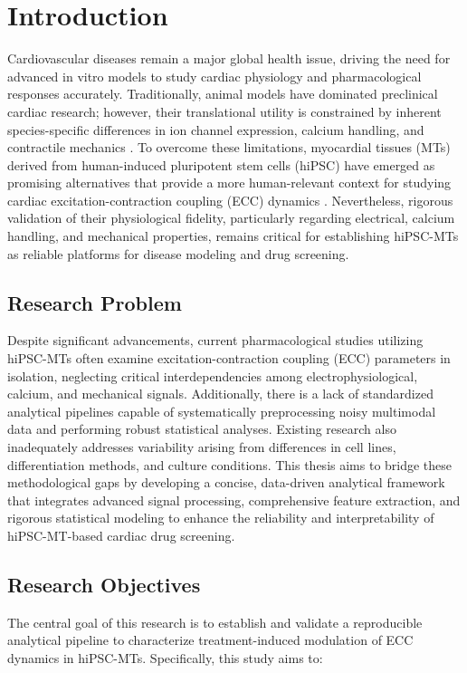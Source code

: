 \documentclass{report}
\begin{document}
\chapter{Introduction}

Cardiovascular diseases remain a major global health issue, driving the need for advanced in vitro models to study cardiac physiology and pharmacological responses accurately. Traditionally, animal models have dominated preclinical cardiac research; however, their translational utility is constrained by inherent species-specific differences in ion channel expression, calcium handling, and contractile mechanics \cite{Zhao2021}. To overcome these limitations, myocardial tissues (MTs) derived from human-induced pluripotent stem cells (hiPSC) have emerged as promising alternatives that provide a more human-relevant context for studying cardiac excitation-contraction coupling (ECC) dynamics \cite{hipcs-cm}. Nevertheless, rigorous validation of their physiological fidelity, particularly regarding electrical, calcium handling, and mechanical properties, remains critical for establishing hiPSC-MTs as reliable platforms for disease modeling and drug screening.

\section{Research Problem}

Despite significant advancements, current pharmacological studies utilizing hiPSC-MTs often examine excitation-contraction coupling (ECC) parameters in isolation, neglecting critical interdependencies among electrophysiological, calcium, and mechanical signals. Additionally, there is a lack of standardized analytical pipelines capable of systematically preprocessing noisy multimodal data and performing robust statistical analyses. Existing research also inadequately addresses variability arising from differences in cell lines, differentiation methods, and culture conditions. This thesis aims to bridge these methodological gaps by developing a concise, data-driven analytical framework that integrates advanced signal processing, comprehensive feature extraction, and rigorous statistical modeling to enhance the reliability and interpretability of hiPSC-MT-based cardiac drug screening.


\section{Research Objectives}
The central goal of this research is to establish and validate a reproducible analytical pipeline to characterize treatment-induced modulation of ECC dynamics in hiPSC-MTs. Specifically, this study aims to:
\end{document}
